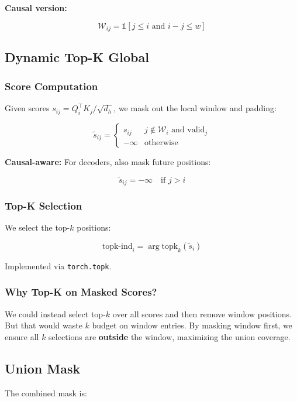 \textbf{Causal version:}

\[
\mathcal{W}_{ij} = \mathbb{1}[j \leq i \text{ and } i - j \leq w]
\tag{4.2}
\]

\subsection{Dynamic Top-K Global}

\subsubsection{Score Computation}

Given scores $s_{ij} = Q_i^\top K_j / \sqrt{d_h}$, we mask out the local 
window and padding:

\[
\tilde{s}_{ij} = \begin{cases} s_{ij} & j \notin \mathcal{W}_i \text{ and valid}_j \\ -\infty & \text{otherwise} \end{cases}
\tag{4.3}
\]

\textbf{Causal-aware:} For decoders, also mask future positions:

\[
\tilde{s}_{ij} = -\infty \quad \text{if } j > i
\tag{4.4}
\]

\subsubsection{Top-K Selection}

We select the top-$k$ positions:

\[
\text{topk-ind}_i = \arg\text{topk}_{k}(\tilde{s}_i)
\tag{4.5}
\]

Implemented via \texttt{torch.topk}.

\subsubsection{Why Top-K on Masked Scores?}

We could instead select top-$k$ over all scores and then remove window 
positions. But that would waste $k$ budget on window entries. By masking 
window first, we ensure all $k$ selections are \textbf{outside} the window, 
maximizing the union coverage.

\subsection{Union Mask}

The combined mask is:

